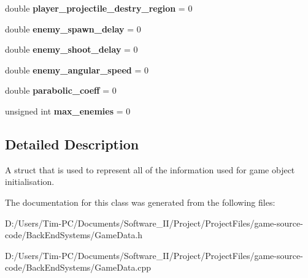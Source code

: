 \begin{DoxyCompactItemize}
\item 
\mbox{\label{struct_game_object_data_a6a48de920f85ec56618b60aae531a583}} 
double {\bfseries player\+\_\+projectile\+\_\+destry\+\_\+region} = 0
\item 
\mbox{\label{struct_game_object_data_a71ac523abe4fdfb74d3661b84a5cbb0b}} 
double {\bfseries enemy\+\_\+spawn\+\_\+delay} = 0
\item 
\mbox{\label{struct_game_object_data_a8501415af53900b1d98ae73e836e4abd}} 
double {\bfseries enemy\+\_\+shoot\+\_\+delay} = 0
\item 
\mbox{\label{struct_game_object_data_a253e5f337879b88a89dfbf2874d5e655}} 
double {\bfseries enemy\+\_\+angular\+\_\+speed} = 0
\item 
\mbox{\label{struct_game_object_data_a8787302d15d2bf0d6b3818460ec8d7a3}} 
double {\bfseries parabolic\+\_\+coeff} = 0
\item 
\mbox{\label{struct_game_object_data_a4b27cd49cdc78b3d977d81e8c88f2c1e}} 
unsigned int {\bfseries max\+\_\+enemies} = 0
\end{DoxyCompactItemize}


\subsection{Detailed Description}
A struct that is used to represent all of the information used for game object initialisation. 

The documentation for this class was generated from the following files\+:\begin{DoxyCompactItemize}
\item 
D\+:/\+Users/\+Tim-\/\+P\+C/\+Documents/\+Software\+\_\+\+I\+I/\+Project/\+Project\+Files/game-\/source-\/code/\+Back\+End\+Systems/Game\+Data.\+h\item 
D\+:/\+Users/\+Tim-\/\+P\+C/\+Documents/\+Software\+\_\+\+I\+I/\+Project/\+Project\+Files/game-\/source-\/code/\+Back\+End\+Systems/Game\+Data.\+cpp\end{DoxyCompactItemize}
